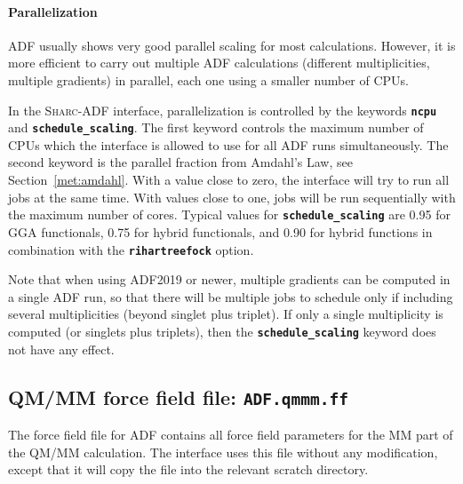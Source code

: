\documentclass[a4paper,10pt,DIV=15,openany]{scrbook}
\newcommand{\sharc}{\textsc{Sharc}}
\newcommand{\ttt}[1]{\textbf{\texttt{#1}}}
\begin{document}
\paragraph{Parallelization}

ADF usually shows very good parallel scaling for most calculations.
However, it is more efficient to carry out multiple ADF calculations (different multiplicities, multiple gradients) in parallel, each one using a smaller number of CPUs.

In the \sharc-ADF interface, parallelization is controlled by the keywords \ttt{ncpu} and \ttt{schedule\_scaling}.
The first keyword controls the maximum number of CPUs which the interface is allowed to use for all ADF runs simultaneously.
The second keyword is the parallel fraction from Amdahl's Law, see Section~\ref{met:amdahl}.
With a value close to zero, the interface will try to run all jobs at the same time. With values close to one, jobs will be run sequentially with the maximum number of cores.
Typical values for \ttt{schedule\_scaling} are 0.95 for GGA functionals, 0.75 for hybrid functionals, and 0.90 for hybrid functions in combination with the \ttt{rihartreefock} option.

Note that when using ADF2019 or newer, multiple gradients can be computed in a single ADF run, so that there will be multiple jobs to schedule only if including several multiplicities (beyond singlet plus triplet).
If only a single multiplicity is computed (or singlets plus triplets), then the \ttt{schedule\_scaling} keyword does not have any effect.





\subsection{QM/MM force field file: \ttt{ADF.qmmm.ff}}

The force field file for ADF contains all force field parameters for the MM part of the QM/MM calculation.
The interface uses this file without any modification, except that it will copy the file into the relevant scratch directory.
\end{document}

